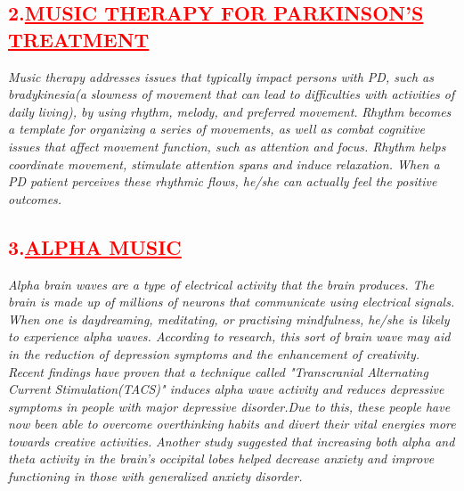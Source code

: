 \documentclass[12pt]{article}
\begin{document}
\subsection*{\textbf{\hspace{1cm}\textcolor{red}{\large{2.\underline{MUSIC THERAPY FOR PARKINSON'S TREATMENT}}}}}
\hspace{1cm}\Large{\emph{Music therapy addresses issues that typically impact persons with PD, such as bradykinesia(a slowness of movement that can lead to difficulties with activities of daily living), by using rhythm, melody, and preferred movement.}}\vspace{1cm}\newline
\hspace{1cm}\Large{\emph{Rhythm becomes a template for organizing a series of movements, as well as combat cognitive issues that affect movement function, such as attention and focus. Rhythm helps coordinate movement, stimulate attention spans and induce relaxation. When a PD patient perceives these rhythmic flows, he/she can actually feel the positive outcomes.}}\vspace{1cm}
\subsection*{\textbf{\hspace{1cm}\textcolor{red}{\large{3.\underline{ALPHA MUSIC}}}}}
\hspace{1cm}\Large{\emph{Alpha brain waves are a type of electrical activity that the brain produces. The brain is made up of millions of neurons that communicate using electrical signals. When one is daydreaming, meditating, or practising mindfulness, he/she is likely to experience alpha waves. According to research, this sort of brain wave may aid in the reduction of depression symptoms and the enhancement of creativity.}}\vspace{1cm}\newline
\hspace{1cm}\Large{\emph{Recent findings have proven that a technique called "Transcranial Alternating Current Stimulation(TACS)" induces alpha wave activity and reduces depressive symptoms in people with major depressive disorder.Due to this, these people have now been able to overcome overthinking habits and divert their vital energies more towards creative activities.}}\vspace{1cm}\newline
\hspace{1cm}\Large{\emph{Another study suggested that increasing both alpha and theta activity in the brain’s occipital lobes helped decrease anxiety and improve functioning in those with generalized anxiety disorder.}}
\end{document}
